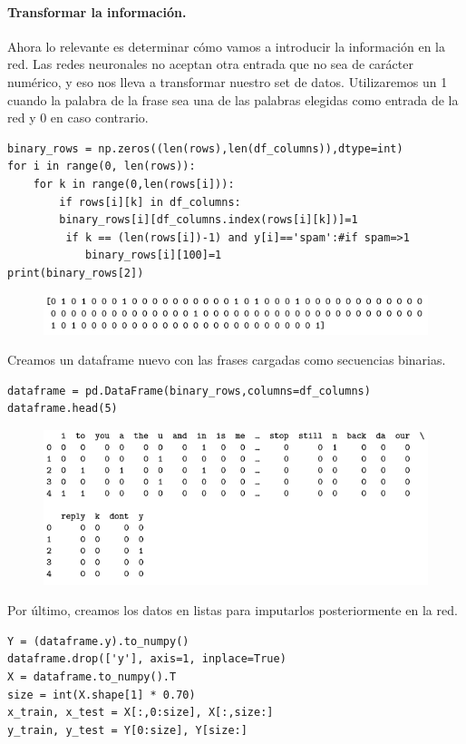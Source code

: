 \documentclass[a4paper,11pt]{article}
\begin{document}
\paragraph{Transformar la información.}
Ahora lo relevante es determinar cómo vamos a introducir la información en la red. Las redes neuronales no aceptan otra entrada que no sea de carácter numérico, y eso nos lleva a transformar nuestro set de datos. Utilizaremos un 1 cuando la palabra de la frase sea una de las palabras elegidas como entrada de la red y 0 en caso contrario.
\begin{lstlisting}
binary_rows = np.zeros((len(rows),len(df_columns)),dtype=int) 
for i in range(0, len(rows)): 
    for k in range(0,len(rows[i])):
        if rows[i][k] in df_columns: 
	    binary_rows[i][df_columns.index(rows[i][k])]=1
         if k == (len(rows[i])-1) and y[i]=='spam':#if spam=>1 
            binary_rows[i][100]=1
print(binary_rows[2])
\end{lstlisting}
\begin{figure}[H]
\centering
\includegraphics[scale=0.83]{Annotation 2020-03-23 182035.png}
\end{figure}
Creamos un dataframe nuevo con las frases cargadas como secuencias binarias.
\begin{lstlisting}
dataframe = pd.DataFrame(binary_rows,columns=df_columns) 
dataframe.head(5)
\end{lstlisting}
\begin{figure}[H]
\centering
\includegraphics[scale=0.83]{Annotation 2020-03-23 182154.png}
\end{figure}
Por último, creamos los datos en listas para imputarlos posteriormente en la red.
\begin{lstlisting}
Y = (dataframe.y).to_numpy() 
dataframe.drop(['y'], axis=1, inplace=True)
X = dataframe.to_numpy().T 
size = int(X.shape[1] * 0.70) 
x_train, x_test = X[:,0:size], X[:,size:] 
y_train, y_test = Y[0:size], Y[size:]
\end{lstlisting}
\end{document}
